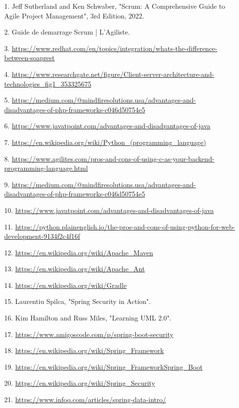 \documentclass[a4paper, 11pt, openany]{report}
\begin{document}
\begin{itemize}
    \item[1.] Jeff Sutherland and Ken Schwaber, "Scrum: A Comprehensive Guide to Agile Project Management", 3rd Edition, 2022.
    \item[2.] Guide de demarrage Scrum | L'Agiliste.
    \item[3.] \url{https://www.redhat.com/en/topics/integration/whats-the-difference-between-soaprest}
    \item[4.] \url{https://www.researchgate.net/figure/Client-server-architecture-and-technologies_fig1_353325675}
    \item[5.] \url{https://medium.com/@mindfiresolutions.usa/advantages-and-disadvantages-of-php-frameworks-c046d50754e5}
    \item[6.] \url{https://www.javatpoint.com/advantages-and-disadvantages-of-java}
    \item[7.] \url{https://en.wikipedia.org/wiki/Python_(programming_language)}
    \item[8.] \url{https://www.agilites.com/pros-and-cons-of-using-c-as-your-backend-programming-language.html}
    \item[9.] \url{https://medium.com/@mindfiresolutions.usa/advantages-and-disadvantages-of-php-frameworks-c046d50754e5}
    \item[10.] \url{https://www.javatpoint.com/advantages-and-disadvantages-of-java}
    \item[11.] \url{https://python.plainenglish.io/the-pros-and-cons-of-using-python-for-web-development-9134f2c4f16f}
    \item[12.] \url{https://en.wikipedia.org/wiki/Apache_Maven}
    \item[13.] \url{https://en.wikipedia.org/wiki/Apache_Ant}
    \item[14.] \url{https://en.wikipedia.org/wiki/Gradle}
    \item[15.] Laurentiu Spilca, "Spring Security in Action".
    \item[16.] Kim Hamilton and Russ Miles, "Learning UML 2.0".
    \item[17.] \url{https://www.amigoscode.com/p/spring-boot-security}
    \item[18.] \url{https://en.wikipedia.org/wiki/Spring_Framework}
    \item[19.] \url{https://en.wikipedia.org/wiki/Spring_FrameworkSpring_Boot}
    \item[20.] \url{https://en.wikipedia.org/wiki/Spring_Security}
    \item[21.] \url{https://www.infoq.com/articles/spring-data-intro/}

\end{itemize}
\end{document}

